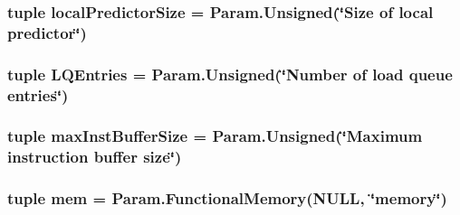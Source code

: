 \label{classSimpleOzoneCPU_1_1SimpleOzoneCPU_a711db16eca8627517aca59fb2aa5565b}
\hypertarget{classSimpleOzoneCPU_1_1SimpleOzoneCPU_ac2af65faa5d32c894af40e4477fbfe65}{
\subsubsection[{localPredictorSize}]{\setlength{\rightskip}{0pt plus 5cm}tuple {\bf localPredictorSize} = Param.Unsigned(\char`\"{}Size of local predictor\char`\"{})}}
\label{classSimpleOzoneCPU_1_1SimpleOzoneCPU_ac2af65faa5d32c894af40e4477fbfe65}
\hypertarget{classSimpleOzoneCPU_1_1SimpleOzoneCPU_ae14ed73e842c3580d021c73c0e2b5aaf}{
\subsubsection[{LQEntries}]{\setlength{\rightskip}{0pt plus 5cm}tuple {\bf LQEntries} = Param.Unsigned(\char`\"{}Number of load queue entries\char`\"{})}}
\label{classSimpleOzoneCPU_1_1SimpleOzoneCPU_ae14ed73e842c3580d021c73c0e2b5aaf}
\hypertarget{classSimpleOzoneCPU_1_1SimpleOzoneCPU_a7bef7a8f745bad1c4151dadaef30c4f7}{
\subsubsection[{maxInstBufferSize}]{\setlength{\rightskip}{0pt plus 5cm}tuple {\bf maxInstBufferSize} = Param.Unsigned(\char`\"{}Maximum instruction buffer size\char`\"{})}}
\label{classSimpleOzoneCPU_1_1SimpleOzoneCPU_a7bef7a8f745bad1c4151dadaef30c4f7}
\hypertarget{classSimpleOzoneCPU_1_1SimpleOzoneCPU_ab7876218fa9fd6c9b26081e50523f133}{
\subsubsection[{mem}]{\setlength{\rightskip}{0pt plus 5cm}tuple {\bf mem} = Param.FunctionalMemory(NULL, \char`\"{}memory\char`\"{})}}
